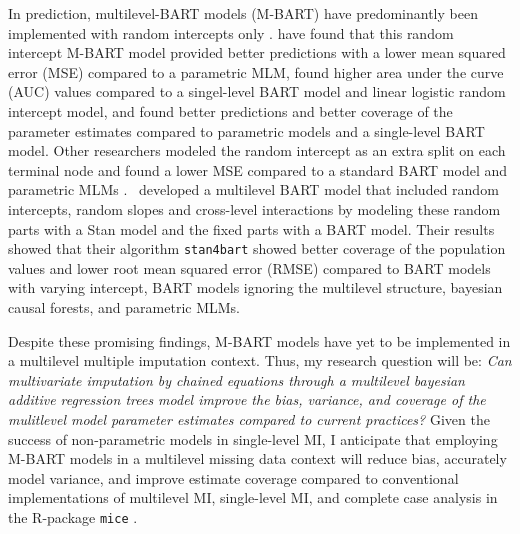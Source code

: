 \documentclass[10pt, a4paper, titlepage]{article}
\begin{document}
In prediction, multilevel-BART models (M-BART) have predominantly been implemented with random intercepts only \citep{chen2020, wagner2020, tan2016, wundervald2022}. \citet{wagner2020} have found that this random intercept M-BART model provided better predictions with a lower mean squared error (MSE) compared to a parametric MLM, \citet{tan2016} found higher area under the curve (AUC) values compared to a singel-level BART model and linear logistic random intercept model, and \citet{chen2020} found better predictions and better coverage of the parameter estimates compared to parametric models and a single-level BART model. Other researchers modeled the random intercept as an extra split on each terminal node and found a lower MSE compared to a standard BART model and parametric MLMs \citep{wundervald2022}.~\citet{dorie2022} developed a multilevel BART model that included random intercepts, random slopes and cross-level interactions by modeling these random parts with a Stan \citep{lee2017} model and the fixed parts with a BART model. Their results showed that their algorithm \texttt{stan4bart} showed better coverage of the population values and lower root mean squared error (RMSE) compared to BART models with varying intercept, BART models ignoring the multilevel structure, bayesian causal forests, and parametric MLMs. 



Despite these promising findings, M-BART models have yet to be implemented in a multilevel multiple imputation context. Thus, my research question will be: \textit{Can multivariate imputation by chained equations through a multilevel bayesian additive regression trees model improve the bias, variance, and coverage of the mulitlevel model parameter estimates compared to current practices?} Given the success of non-parametric models in single-level MI, I anticipate that employing M-BART models in a multilevel missing data context will reduce bias, accurately model variance, and improve estimate coverage compared to conventional implementations of multilevel MI, single-level MI, and complete case analysis in the R-package \texttt{mice} \citep{buuren2011}. 
\end{document}
